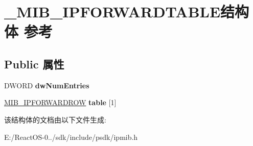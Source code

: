 \hypertarget{struct___m_i_b___i_p_f_o_r_w_a_r_d_t_a_b_l_e}{}\section{\+\_\+\+M\+I\+B\+\_\+\+I\+P\+F\+O\+R\+W\+A\+R\+D\+T\+A\+B\+L\+E结构体 参考}
\label{struct___m_i_b___i_p_f_o_r_w_a_r_d_t_a_b_l_e}
\subsection*{Public 属性}
\begin{DoxyCompactItemize}
\item 
\mbox{\label{struct___m_i_b___i_p_f_o_r_w_a_r_d_t_a_b_l_e_a73e95a3b43a819fc98b7fa1bd116f2ce}} 
D\+W\+O\+RD {\bfseries dw\+Num\+Entries}
\item 
\mbox{\label{struct___m_i_b___i_p_f_o_r_w_a_r_d_t_a_b_l_e_abe98b97bf64c7de6c12b2f852cdf6c0c}} 
\hyperlink{struct___m_i_b___i_p_f_o_r_w_a_r_d_r_o_w}{M\+I\+B\+\_\+\+I\+P\+F\+O\+R\+W\+A\+R\+D\+R\+OW} {\bfseries table} \mbox{[}1\mbox{]}
\end{DoxyCompactItemize}


该结构体的文档由以下文件生成\+:\begin{DoxyCompactItemize}
\item 
E\+:/\+React\+O\+S-\/0../sdk/include/psdk/ipmib.\+h\end{DoxyCompactItemize}
